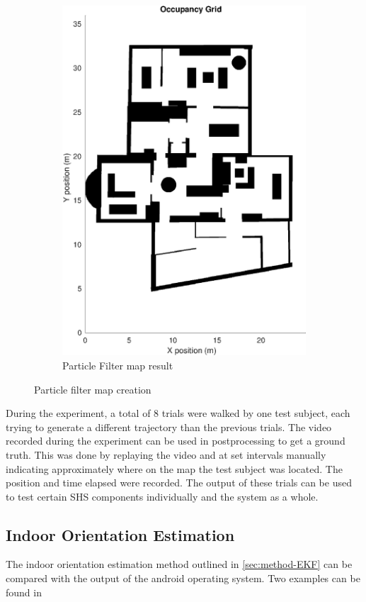 \begin{figure}[H]
\begin{subfigure}[t]{.3\textwidth}
	\includegraphics[width=0.9\linewidth]{images/20201030_1157_pf_map_1}
	\caption{Particle Filter map result}
	\label{fig:pf_map}
\end{subfigure}
\label{fig:particle_map_construction}
\caption{Particle filter map creation}
\end{figure}

During the experiment, a total of 8 trials were walked by one test subject, each trying to generate a different trajectory than the previous trials. The video recorded during the experiment can be used in postprocessing to get a ground truth. This was done by replaying the video and at set intervals manually indicating approximately where on the map the test subject was located. The position and time elapsed were recorded. The output of these trials can be used to test certain SHS components individually and the system as a whole.



\subsection{Indoor Orientation Estimation}
The indoor orientation estimation method outlined in \cref{sec:method-EKF} can be compared with the output of the android operating system. Two examples can be found in 

